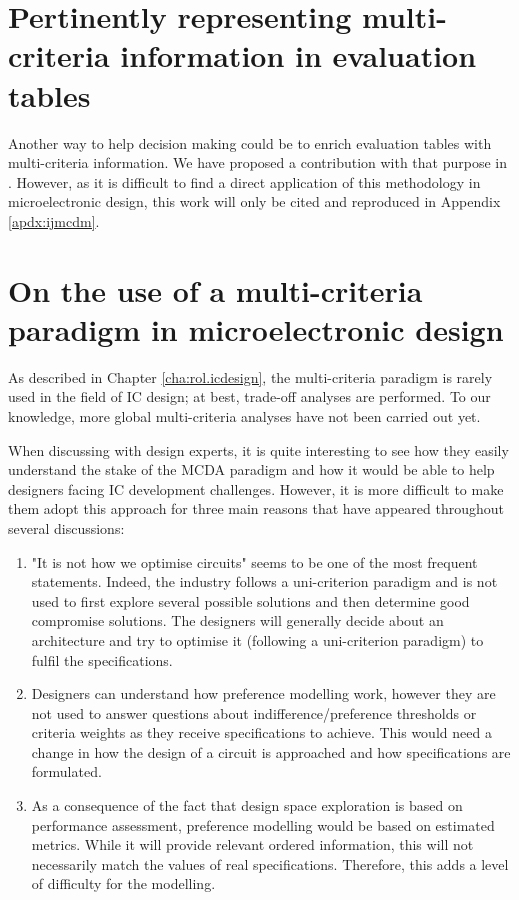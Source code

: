\section{Pertinently representing multi-criteria information in evaluation tables}
Another way to help decision making could be to enrich evaluation tables with multi-criteria information. We have proposed a contribution with that purpose in \cite{LidDoaDes2014:techreport}. However, as it is difficult to find a direct application of this methodology in microelectronic design, this work will only be cited and reproduced in Appendix \ref{apdx:ijmcdm}.

\section{On the use of a multi-criteria paradigm in microelectronic design}
As described in Chapter \ref{cha:rol.icdesign}, the multi-criteria paradigm is rarely used in the field of IC design; at best, trade-off analyses are performed. To our knowledge, more global multi-criteria analyses have not been carried out yet.

When discussing with design experts, it is quite interesting to see how they easily understand the stake of the MCDA paradigm and how it would be able to help designers facing IC development challenges. However, it is more difficult to make them adopt this approach for three main reasons that have appeared throughout several discussions:

\begin{enumerate}
\item "It is not how we optimise circuits" seems to be one of the most frequent statements. Indeed, the industry follows a uni-criterion paradigm and is not used to first explore several possible solutions and then determine good compromise solutions. The designers will generally decide about an architecture and try to optimise it (following a uni-criterion paradigm) to fulfil the specifications.
\item Designers can understand how preference modelling work, however they are not used to answer questions about indifference/preference thresholds or criteria weights as they receive specifications to achieve. This would need a change in how the design of a circuit is approached and how specifications are formulated.
\item As a consequence of the fact that design space exploration is based on performance assessment, preference modelling would be based on estimated metrics. While it will provide relevant ordered information, this will not necessarily match the values of real specifications. Therefore, this adds a level of difficulty for the modelling.
\end{enumerate}

